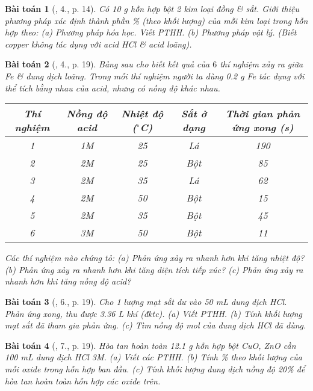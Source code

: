 \documentclass{article}
\newtheorem{baitoan}{Bài toán}
\begin{document}
\begin{baitoan}[\cite{SGK_Hoa_Hoc_9}, 4., p. 14]
	Có \emph{10 g} hỗn hợp bột 2 kim loại đồng \& sắt. Giới thiệu phương pháp xác định thành phần \% (theo khối lượng) của mỗi kim loại trong hỗn hợp theo: (a) Phương pháp hóa học. Viết PTHH. (b) Phương pháp vật lý. (Biết copper không tác dụng với acid \emph{HCl} \& acid \emph{} loãng).
\end{baitoan}

\begin{baitoan}[\cite{SGK_Hoa_Hoc_9}, 4., p. 19]
	Bảng sau cho biết kết quả của $6$ thí nghiệm xảy ra giữa \emph{Fe} \& dung dịch \emph{} loãng. Trong mỗi thí nghiệm người ta dùng \emph{0.2 g Fe} tác dụng với thể tích bằng nhau của acid, nhưng có nồng độ khác nhau.
	\begin{table}[H]
		\centering
		\begin{tabular}{|c|c|c|c|c|}
			\hline
			Thí nghiệm & Nồng độ acid & Nhiệt độ (${}^\circ$C) & Sắt ở dạng & Thời gian phản ứng xong (s) \\
			\hline
			1 & 1M & 25 & Lá & 190 \\
			\hline
			2 & 2M & 25 & Bột & 85 \\
			\hline
			3 & 2M & 35 & Lá & 62 \\
			\hline
			4 & 2M & 50 & Bột & 15 \\
			\hline
			5 & 2M & 35 & Bột & 45 \\
			\hline
			6 & 3M & 50 & Bột & 11 \\
			\hline
		\end{tabular}
	\end{table}
	\noindent Các thí nghiệm nào chứng tỏ: (a) Phản ứng xảy ra nhanh hơn khi tăng nhiệt độ? (b) Phản ứng xảy ra nhanh hơn khi tăng diện tích tiếp xúc? (c) Phản ứng xảy ra nhanh hơn khi tăng nồng độ acid?
\end{baitoan}

\begin{baitoan}[\cite{SGK_Hoa_Hoc_9}, 6., p. 19]
	Cho 1 lượng mạt sắt dư vào \emph{50 mL} dung dịch \emph{HCl}. Phản ứng xong, thu được \emph{3.36 L} khí (đktc). (a) Viết PTHH. (b) Tính khối lượng mạt sắt đã tham gia phản ứng. (c) Tìm nồng độ mol của dung dịch \emph{HCl} đã dùng.
\end{baitoan}

\begin{baitoan}[\cite{SGK_Hoa_Hoc_9}, 7., p. 19]
	Hòa tan hoàn toàn \emph{12.1 g} hỗn hợp bột \emph{CuO, ZnO} cần \emph{100 mL} dung dịch \emph{HCl 3M}. (a) Viết các PTHH. (b) Tính \% theo khối lượng của mỗi oxide trong hỗn hợp ban đầu. (c) Tính khối lượng dung dịch \emph{} nồng độ \emph{20\%} để hòa tan hoàn toàn hỗn hợp các oxide trên.
\end{baitoan}
\end{document}
